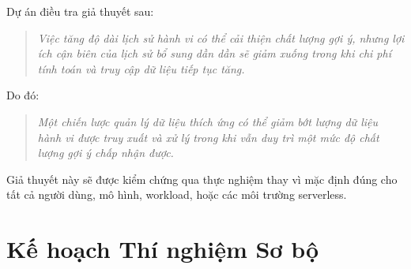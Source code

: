 \documentclass[12pt,a4paper]{article}
\begin{document}
Dự án điều tra giả thuyết sau:
\begin{quote}
\textit{Việc tăng độ dài lịch sử hành vi có thể cải thiện chất lượng gợi ý, nhưng lợi ích cận biên của lịch sử bổ sung dần dần sẽ giảm xuống trong khi chi phí tính toán và truy cập dữ liệu tiếp tục tăng.}
\end{quote}

Do đó:
\begin{quote}
\textit{Một chiến lược quản lý dữ liệu thích ứng có thể giảm bớt lượng dữ liệu hành vi được truy xuất và xử lý trong khi vẫn duy trì một mức độ chất lượng gợi ý chấp nhận được.}
\end{quote}

Giả thuyết này sẽ được kiểm chứng qua thực nghiệm thay vì mặc định đúng cho tất cả người dùng, mô hình, workload, hoặc các môi trường serverless.

\section{Kế hoạch Thí nghiệm Sơ bộ}
\end{document}
